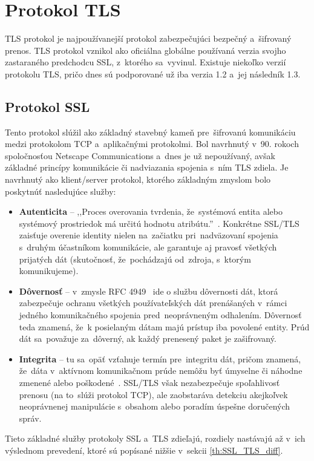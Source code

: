 \section{Protokol TLS}
TLS protokol je najpoužívanejší protokol zabezpečujúci bezpečný a~šifrovaný prenos. TLS protokol vznikol ako oficiálna globálne používaná verzia svojho zastaraného predchodcu SSL, z~ktorého sa~vyvinul. Existuje niekoľko verzií protokolu TLS, pričo dnes sú podporované už iba verzia 1.2 a~jej následník 1.3.~\cite{rfc8996}

\subsection{Protokol SSL}
Tento protokol slúžil ako základný stavebný kameň pre~šifrovanú komunikáciu medzi protokolom TCP a~aplikačnými protokolmi. Bol navrhnutý v~90. rokoch spoločnosťou Netscape Communications a~dnes je už nepoužívaný, avšak základné princípy komunikácie či nadviazania spojenia s~ním TLS zdiela. Je navrhnutý ako klient/server protokol, ktorého základným zmyslom bolo poskytnúť nasledujúce služby:~\cite{oppliger2023ssl}
\begin{itemize}
    \item \textbf{Autenticita} -- ,,Proces overovania tvrdenia, že~systémová entita alebo systémový prostriedok má určitú hodnotu atribútu.''~\cite{rfc4949}. Konkrétne SSL/TLS zaisťuje overenie identity nielen na~začiatku pri~nadväzovaní spojenia s~druhým účastníkom komunikácie, ale garantuje aj pravosť všetkých prijatých dát (skutočnosť, že~pochádzajú od~zdroja, s~ktorým komunikujeme).
    
    \item \textbf{Dôvernosť} -- v~zmysle RFC 4949~\cite{rfc4949} ide o službu dôvernosti dát, ktorá zabezpečuje ochranu všetkých používateľských dát prenášaných v~rámci jedného komunikačného spojenia pred~neoprávneným odhalením. Dôvernosť teda znamená, že~k posielaným dátam majú prístup iba povolené entity. Prúd dát sa~považuje za~dôverný, ak každý prenesený paket je zašifrovaný.

    \item \textbf{Integrita} -- tu sa~opäť vzťahuje termín pre~integritu dát, pričom znamená, že~dáta v~aktívnom komunikačnom prúde nemôžu byť úmyselne či náhodne zmenené alebo poškodené~\cite{rfc4949}. SSL/TLS však nezabezpečuje spoľahlivosť prenosu (na to~slúži protokol TCP), ale zaobstaráva detekciu akejkoľvek neoprávnenej manipulácie s~obsahom alebo poradím úspešne doručených správ.
\end{itemize}
Tieto základné služby protokoly SSL a~TLS zdieľajú, rozdiely nastávajú až v~ich výslednom prevedení, ktoré sú popísané nižšie v~sekcii \ref{th:SSL_TLS_diff}.


